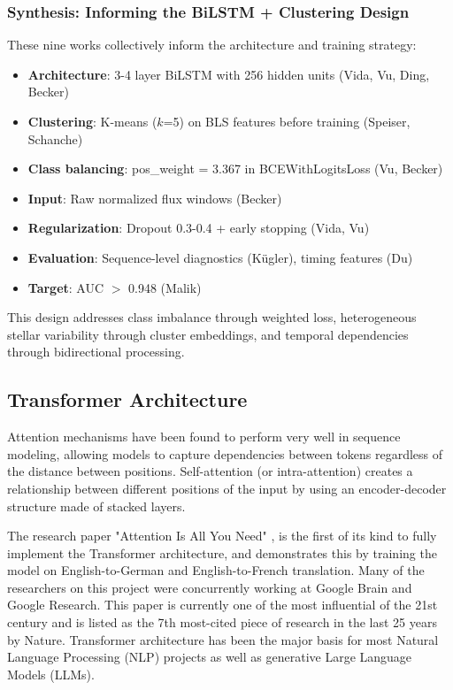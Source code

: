 \documentclass[letterpaper]{article} %
\begin{document}
\subsubsection{Synthesis: Informing the BiLSTM + Clustering Design}

These nine works collectively inform the architecture and training strategy:

\begin{itemize}
    \item \textbf{Architecture}: 3-4 layer BiLSTM with 256 hidden units (Vida, Vu, Ding, Becker)
    \item \textbf{Clustering}: K-means ($k$=5) on BLS features before training (Speiser, Schanche)
    \item \textbf{Class balancing}: pos\_weight = 3.367 in BCEWithLogitsLoss (Vu, Becker)
    \item \textbf{Input}: Raw normalized flux windows (Becker)
    \item \textbf{Regularization}: Dropout 0.3-0.4 + early stopping (Vida, Vu)
    \item \textbf{Evaluation}: Sequence-level diagnostics (K\"ugler), timing features (Du)
    \item \textbf{Target}: AUC $>$ 0.948 (Malik)
\end{itemize}

This design addresses class imbalance through weighted loss, heterogeneous stellar variability through cluster embeddings, and temporal dependencies through bidirectional processing.

\subsection{Transformer Architecture}
Attention mechanisms have been found to perform very well in sequence modeling, allowing models to capture dependencies between tokens regardless of the distance between positions. Self-attention (or intra-attention) creates a relationship between different positions of the input by using an encoder-decoder structure made of stacked layers.

The research paper "Attention Is All You Need" \cite{vaswani2017attentionneed}, is the first of its kind to fully implement the Transformer architecture, and demonstrates this by training the model on English-to-German and English-to-French translation. Many of the researchers on this project were concurrently working at Google Brain and Google Research. This paper is currently one of the most influential of the 21st century and is listed as the 7th most-cited piece of research in the last 25 years by Nature. Transformer architecture has been the major basis for most Natural Language Processing (NLP) projects as well as generative Large Language Models (LLMs).
\end{document}
